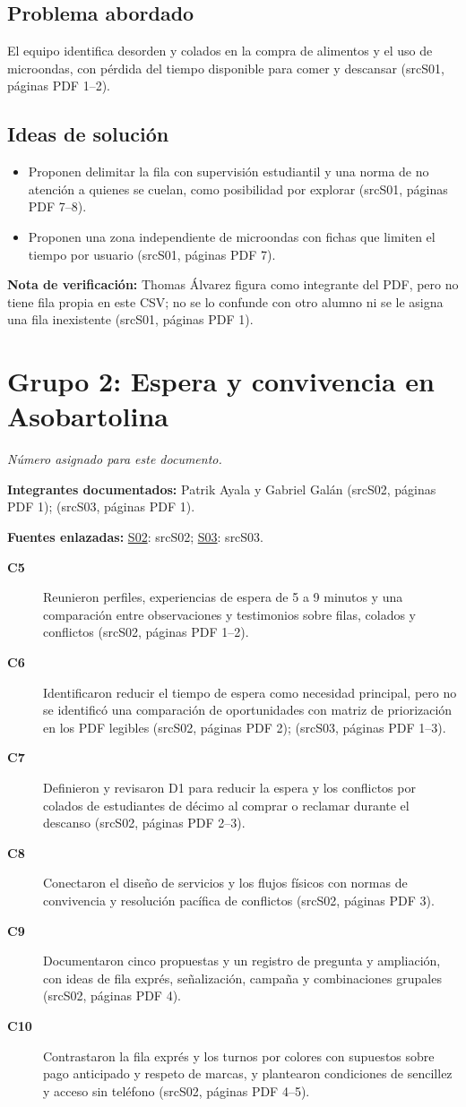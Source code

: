 \documentclass[11pt,a4paper]{article}
\newcommand{\evid}[2]{(\csname src#1\endcsname, páginas PDF #2)}
\begin{document}
\subsection*{Problema abordado}
El equipo identifica desorden y colados en la compra de alimentos y el uso de microondas, con pérdida del tiempo disponible para comer y descansar \evid{S01}{1--2}.
\subsection*{Ideas de solución}
\begin{itemize}
\item Proponen delimitar la fila con supervisión estudiantil y una norma de no atención a quienes se cuelan, como posibilidad por explorar \evid{S01}{7--8}.
\item Proponen una zona independiente de microondas con fichas que limiten el tiempo por usuario \evid{S01}{7}.
\end{itemize}
{\small\textbf{Nota de verificación:} Thomas Álvarez figura como integrante del PDF, pero no tiene fila propia en este CSV; no se lo confunde con otro alumno ni se le asigna una fila inexistente \evid{S01}{1}.}
\clearpage
\section*{Grupo 2: Espera y convivencia en Asobartolina}
\textit{Número asignado para este documento.}

\textbf{Integrantes documentados:} Patrik Ayala y Gabriel Galán \evid{S02}{1}; \evid{S03}{1}.

\textbf{Fuentes enlazadas:} \hyperlink{fuente-S02}{S02}: \csname srcS02\endcsname; \hyperlink{fuente-S03}{S03}: \csname srcS03\endcsname.

\begin{description}
\item[\textbf{C5}] Reunieron perfiles, experiencias de espera de 5 a 9 minutos y una comparación entre observaciones y testimonios sobre filas, colados y conflictos \evid{S02}{1--2}.
\item[\textbf{C6}] Identificaron reducir el tiempo de espera como necesidad principal, pero no se identificó una comparación de oportunidades con matriz de priorización en los PDF legibles \evid{S02}{2}; \evid{S03}{1--3}.
\item[\textbf{C7}] Definieron y revisaron D1 para reducir la espera y los conflictos por colados de estudiantes de décimo al comprar o reclamar durante el descanso \evid{S02}{2--3}.
\item[\textbf{C8}] Conectaron el diseño de servicios y los flujos físicos con normas de convivencia y resolución pacífica de conflictos \evid{S02}{3}.
\item[\textbf{C9}] Documentaron cinco propuestas y un registro de pregunta y ampliación, con ideas de fila exprés, señalización, campaña y combinaciones grupales \evid{S02}{4}.
\item[\textbf{C10}] Contrastaron la fila exprés y los turnos por colores con supuestos sobre pago anticipado y respeto de marcas, y plantearon condiciones de sencillez y acceso sin teléfono \evid{S02}{4--5}.
\end{description}
\end{document}
